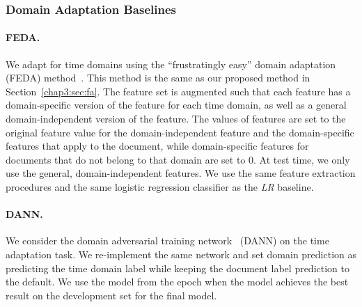 \subsubsection{Domain Adaptation Baselines}

\paragraph{FEDA.} 
We adapt for time domains using the ``frustratingly easy'' domain adaptation (FEDA) method~\cite{daume2007frustratingly}. 
This method is the same as our proposed method in Section~\ref{chap3:sec:fa}.
The feature set is augmented such that each feature has a domain-specific version of the feature for each time domain, as well as a general domain-independent version of the feature.
The values of features are set to the original feature value for the domain-independent feature and the domain-specific features that apply to the document, while domain-specific features for documents that do not belong to that domain are set to $0$.
At test time, we only use the general, domain-independent features. 
We use the same feature extraction procedures and the same logistic regression classifier as the \textit{LR} baseline.

\paragraph{DANN.} 
We consider the domain adversarial training network~\cite{ganin2016domain} (DANN) on the time adaptation task. We re-implement the same network and set domain prediction as predicting the time domain label while keeping the document label prediction to the default. We use the model from the epoch when the model achieves the best result on the development set for the final model.

